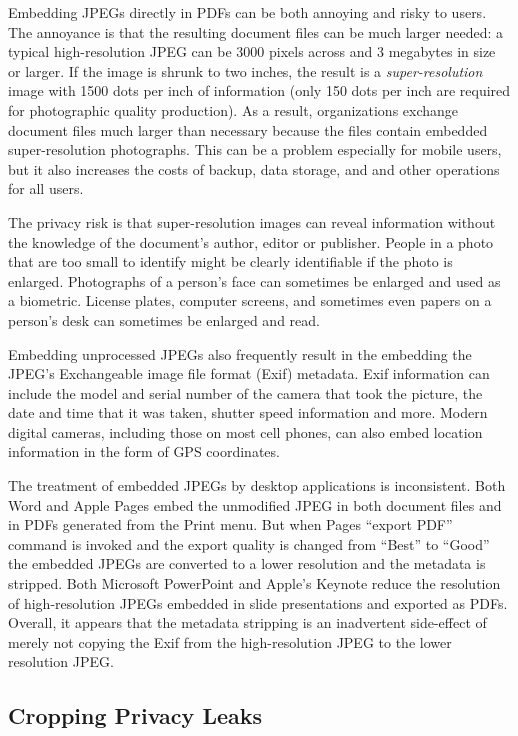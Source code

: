 Embedding JPEGs directly in PDFs
can be both annoying and  risky to
users. The annoyance is that the resulting document files  can
be much larger needed: a typical high-resolution JPEG
can be 3000 pixels across and 3
megabytes in size or larger. If the image is shrunk  to two
inches, the result is a \emph{super-resolution} image with 1500 dots
per inch of information (only 150 dots per inch are required for
photographic quality production). As a result,  organizations exchange
document files  much larger than necessary because the files
contain embedded super-resolution photographs. This can be a
problem especially for mobile users, but it also increases the costs of backup,
data storage, and and other operations for all users.

The privacy risk is that super-resolution images can reveal information
without the knowledge of the document's author, editor or
publisher. People in a photo that are too small to identify might be
clearly identifiable if the photo is enlarged. Photographs of a
person's face can sometimes be enlarged and used as a
biometric. License plates, computer screens, and sometimes even papers
on a person's desk can sometimes be enlarged and read. 

Embedding unprocessed JPEGs also frequently result in the
embedding the JPEG's Exchangeable image file format (Exif) metadata. Exif
information can include the model and serial number of the camera that
took the picture, the date and time that it was taken, shutter speed
information and more. Modern digital cameras, including those on most
cell phones, can also embed location information in the form of GPS
coordinates.

The treatment of embedded JPEGs by desktop applications is
inconsistent. Both Word and Apple Pages embed the
unmodified JPEG in both document files and in PDFs generated from the Print
menu. But when Pages ``export PDF'' command is invoked and the export
quality is changed from ``Best'' to ``Good'' the embedded
JPEGs are converted to a lower resolution and the metadata is stripped.
Both Microsoft PowerPoint and Apple's Keynote reduce the resolution of
high-resolution JPEGs embedded in slide presentations and exported as
PDFs. Overall,  it appears that the metadata stripping is an
inadvertent side-effect of
merely not copying the Exif from the high-resolution JPEG to the lower
resolution JPEG.


\subsection{Cropping Privacy Leaks}

